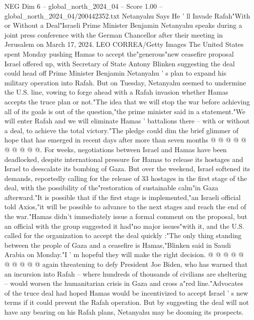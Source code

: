 \begin{textsample}{NEG Dim 6 – global\_north\_2024\_04 – Score 1.00 – global\_north\_2024\_04/200442352.txt}  \label{ex:f6_neg_374}
Netanyahu Says He ' ll Invade Rafah"With or Without a Deal"Israeli Prime Minister Benjamin Netanyahu speaks during a joint press conference with the German Chancellor after their meeting in Jerusalem on March 17, 2024.
LEO CORREA/Getty Images The United States spent Monday pushing Hamas to accept the"generous"new ceasefire proposal Israel offered up, with Secretary of State Antony Blinken suggesting the deal could head off Prime Minister Benjamin Netanyahu ' s plan to expand his military operation into Rafah.
But on Tuesday, Netanyahu seemed to undermine the U.S. line, vowing to forge ahead with a Rafah invasion whether Hamas accepts the truce plan or not."The idea that we will stop the war before achieving all of its goals is out of the question,"the prime minister said in a statement."We will enter Rafah and we will eliminate Hamas ' battalions there -- with or without a deal, to achieve the total victory."The pledge could dim the brief glimmer of hope that has emerged in recent days after more than seven months @ @ @ @ @ @ @ @ @ @.
For weeks, negotiations between Israel and Hamas have been deadlocked, despite international pressure for Hamas to release its hostages and Israel to deescalate its bombing of Gaza.
But over the weekend, Israel softened its demands, reportedly calling for the release of 33 hostages in the first stage of the deal, with the possibility of the"restoration of sustainable calm"in Gaza afterward."It is possible that if the first stage is implemented,"an Israeli official told Axios,"it will be possible to advance to the next stages and reach the end of the war."Hamas didn't immediately issue a formal comment on the proposal, but an official with the group suggested it had"no major issues"with it, and the U.S. called for the organization to accept the deal quickly :"The only thing standing between the people of Gaza and a ceasefire is Hamas,"Blinken said in Saudi Arabia on Monday."I ' m hopeful they will make the right decision. @ @ @ @ @ @ @ @ @ @ again threatening to defy President Joe Biden, who has warned that an incursion into Rafah -- where hundreds of thousands of civilians are sheltering -- would worsen the humanitarian crisis in Gaza and cross a"red line."Advocates of the truce deal had hoped Hamas would be incentivized to accept Israel ' s new terms if it could prevent the Rafah operation.
But by suggesting the deal will not have any bearing on his Rafah plans, Netanyahu may be dooming its prospects.

\end{textsample}
